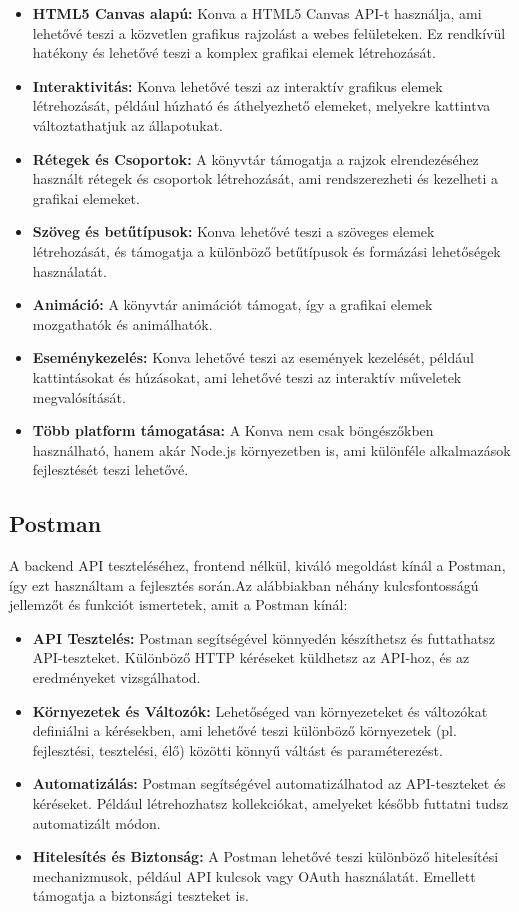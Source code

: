 \documentclass[a4paper,twoside]{article}
\begin{document}
\begin{itemize}
	\item \textbf{HTML5 Canvas alapú:} Konva a HTML5 Canvas API-t használja, ami lehetővé teszi a közvetlen grafikus rajzolást a webes felületeken. Ez rendkívül hatékony és lehetővé teszi a komplex grafikai elemek létrehozását.
	\item \textbf{Interaktivitás:} Konva lehetővé teszi az interaktív grafikus elemek létrehozását, például húzható és áthelyezhető elemeket, melyekre kattintva változtathatjuk az állapotukat.
	\item \textbf{Rétegek és Csoportok:} A könyvtár támogatja a rajzok elrendezéséhez használt rétegek és csoportok létrehozását, ami rendszerezheti és kezelheti a grafikai elemeket.
	\item \textbf{Szöveg és betűtípusok:} Konva lehetővé teszi a szöveges elemek létrehozását, és támogatja a különböző betűtípusok és formázási lehetőségek használatát.
	\item \textbf{Animáció:} A könyvtár animációt támogat, így a grafikai elemek mozgathatók és animálhatók.
	\item \textbf{Eseménykezelés:} Konva lehetővé teszi az események kezelését, például kattintásokat és húzásokat, ami lehetővé teszi az interaktív műveletek megvalósítását.
	\item \textbf{Több platform támogatása:} A Konva nem csak böngészőkben használható, hanem akár Node.js környezetben is, ami különféle alkalmazások fejlesztését teszi lehetővé.
\end{itemize}


\subsection{Postman}
A backend API teszteléséhez, frontend nélkül, kiváló megoldást kínál a Postman\cite{postman}, így ezt használtam a fejlesztés során.Az alábbiakban néhány kulcsfontosságú jellemzőt és funkciót ismertetek, amit a Postman kínál:

\begin{itemize}
	\item \textbf{API Tesztelés:} Postman segítségével könnyedén készíthetsz és futtathatsz API-teszteket. Különböző HTTP kéréseket küldhetsz az API-hoz, és az eredményeket vizsgálhatod.
	\item \textbf{Környezetek és Változók:} Lehetőséged van környezeteket és változókat definiálni a kérésekben, ami lehetővé teszi különböző környezetek (pl. fejlesztési, tesztelési, élő) közötti könnyű váltást és paraméterezést.
	\item \textbf{Automatizálás:} Postman segítségével automatizálhatod az API-teszteket és kéréseket. Például létrehozhatsz kollekciókat, amelyeket később futtatni tudsz automatizált módon.
	\item \textbf{Hitelesítés és Biztonság:} A Postman lehetővé teszi különböző hitelesítési mechanizmusok, például API kulcsok vagy OAuth használatát. Emellett támogatja a biztonsági teszteket is.
\end{itemize}
\end{document}
